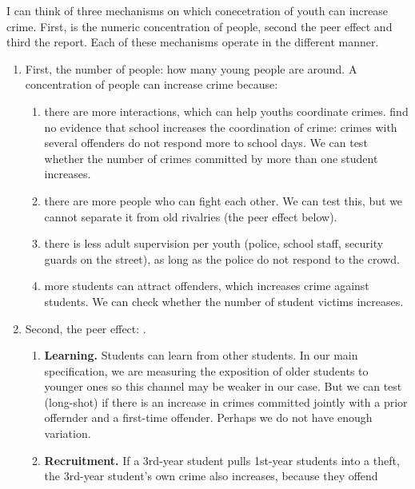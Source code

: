 I can think of three mechanisms on which conecetration of youth can increase crime. First, is the numeric concentration of people, second the peer effect and 
third the report. Each of these mechanisms operate in the different manner. 
\begin{enumerate}
      \item[A.] First, the number of people: how many young people are around.
            A concentration of people can increase crime because:
      \begin{enumerate}
            \item there are more interactions, which can help youths
                  coordinate crimes. \citet{jacob2003} find no evidence that
                  school increases the coordination of crime: crimes with
                  several offenders do not respond more to school days. We can
                  test whether the number of crimes committed by more than one
                  student increases.
            \item there are more people who can fight each other. We can test
                  this, but we cannot separate it from old rivalries (the peer
                  effect below).
            \item there is less adult supervision per youth (police, school
                  staff, security guards on the street), as long as the police
                  do not respond to the crowd.
            \item more students can attract offenders, which increases crime
                  against students. We can check whether the number of student
                  victims increases.
      \end{enumerate}
      \item[B.] Second, the peer effect: .
      \begin{enumerate}
            \item \textbf{Learning.} Students can learn from other students.
                  In our main specification, we are measuring the exposition of older students to
                  younger ones so this channel may be weaker in our case. But we can test (long-shot) if there is an increase in crimes
                   committed jointly with a prior offernder and a first-time offender.  Perhaps we do not have enough variation. 
            \item \textbf{Recruitment.} If a 3rd-year
                  student pulls 1st-year students into a theft, the 3rd-year
                  student's own crime also increases, because they offend

\end{enumerate}
\end{enumerate}

